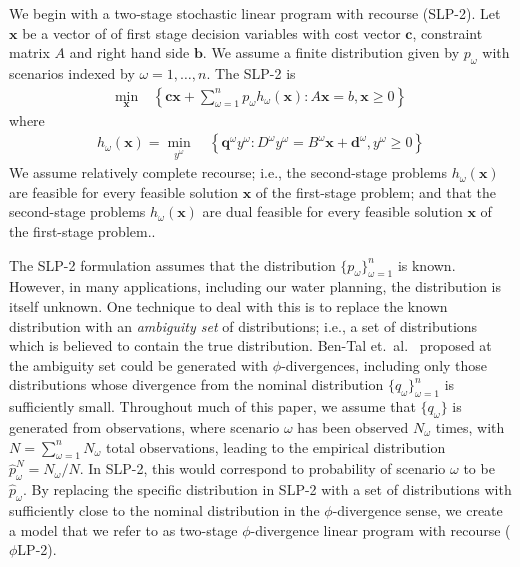 \documentclass[11pt]{article}
\newcommand{\x}{\mathbf{x}}
\renewcommand{\c}{\mathbf{c}}
\newcommand{\q}{\mathbf{q}}
\renewcommand{\b}{\mathbf{b}}
\renewcommand{\d}{\mathbf{d}}
\newcommand{\st}{\mbox{s.t.}}
\newcommand{\plp}{$\phi$LP-2}
\begin{document}
We begin with a two-stage stochastic linear program with recourse (SLP-2).
Let $\x$ be a vector of of first stage decision variables with cost vector $\c$, constraint matrix $A$ and right hand side $\b$.
We assume a finite distribution given by $p_\omega$ with scenarios indexed by $\omega = 1, \dots, n$.
The SLP-2 is
\begin{align}
	\min_\x \ & \left\{ \c\x + \sum_{\omega=1}^n p_\omega h_\omega(\x) : A\x = b, \x \geq 0 \right\} \label{eq:slp_first_stage}%
\end{align}
where
\begin{align}
	h_\omega(\x) = \min_{y^\omega} \ & \left\{ \q^\omega y^\omega : D^\omega y^\omega = B^\omega \x + \d^\omega, y^\omega \geq 0 \right\} \label{eq:slp_second_stage}%
\end{align}
We assume relatively complete recourse; i.e., the second-stage problems $h_\omega(\x)$ are feasible for every feasible solution $\x$ of the first-stage problem; and that the second-stage problems $h_\omega(\x)$ are dual feasible for every feasible solution $\x$ of the first-stage problem..

The SLP-2 formulation assumes that the distribution $\{p_\omega\}_{\omega=1}^n$ is known.
However, in many applications, including our water planning, the distribution is itself unknown.
One technique to deal with this is to replace the known distribution with an {\it ambiguity set} of distributions; i.e., a set of distributions which is believed to contain the true distribution.
Ben-Tal et.\ al.\ \cite{bental2011robust} proposed at the ambiguity set could be generated with $\phi$-divergences, including only those distributions whose divergence from the nominal distribution $\{q_\omega\}_{\omega=1}^n$ is sufficiently small.
Throughout much of this paper, we assume that $\{q_\omega\}$ is generated from observations, where scenario $\omega$ has been observed $N_\omega$ times, with $N = \sum_{\omega=1}^n N_\omega$ total observations, leading to the empirical distribution $\hat{p}^N_\omega = N_\omega / N$.
In SLP-2, this would correspond to probability of scenario $\omega$ to be $\hat{p}_\omega$.
By replacing the specific distribution in SLP-2 with a set of distributions with sufficiently close to the nominal distribution in the $\phi$-divergence sense, we create a model that we refer to as two-stage $\phi$-divergence linear program with recourse (\plp).
\end{document}
